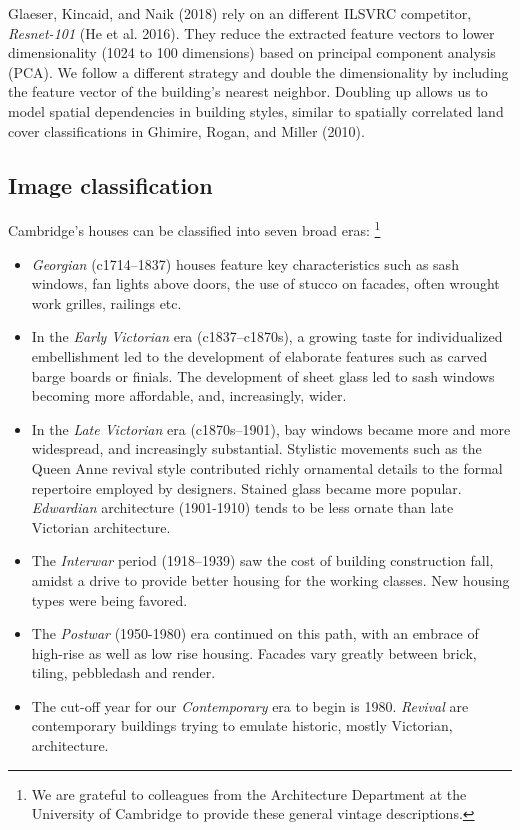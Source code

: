 \documentclass[]{article}
\let\rmarkdownfootnote\footnote%
\def\footnote{\protect\rmarkdownfootnote}
\begin{document}
Glaeser, Kincaid, and Naik (2018) rely on an different ILSVRC
competitor, \emph{Resnet-101} (He et al. 2016). They reduce the
extracted feature vectors to lower dimensionality (1024 to 100
dimensions) based on principal component analysis (PCA). We follow a
different strategy and double the dimensionality by including the
feature vector of the building's nearest neighbor. Doubling up allows us
to model spatial dependencies in building styles, similar to spatially
correlated land cover classifications in Ghimire, Rogan, and Miller
(2010).

\hypertarget{image-classification}{%
\subsection{Image classification}\label{image-classification}}

Cambridge's houses can be classified into seven broad eras:
\footnote{We are grateful to colleagues from the Architecture Department at the University of Cambridge to provide these general vintage descriptions.}

\begin{itemize}
\item
  \emph{Georgian} (c1714--1837) houses feature key characteristics such
  as sash windows, fan lights above doors, the use of stucco on facades,
  often wrought work grilles, railings etc.\label{def_eras}
\item
  In the \emph{Early Victorian} era (c1837--c1870s), a growing taste for
  individualized embellishment led to the development of elaborate
  features such as carved barge boards or finials. The development of
  sheet glass led to sash windows becoming more affordable, and,
  increasingly, wider.
\item
  In the \emph{Late Victorian} era (c1870s--1901), bay windows became
  more and more widespread, and increasingly substantial. Stylistic
  movements such as the Queen Anne revival style contributed richly
  ornamental details to the formal repertoire employed by designers.
  Stained glass became more popular. \emph{Edwardian} architecture
  (1901-1910) tends to be less ornate than late Victorian architecture.
\item
  The \emph{Interwar} period (1918--1939) saw the cost of building
  construction fall, amidst a drive to provide better housing for the
  working classes. New housing types were being favored.
\item
  The \emph{Postwar} (1950-1980) era continued on this path, with an
  embrace of high-rise as well as low rise housing. Facades vary greatly
  between brick, tiling, pebbledash and render.
\item
  The cut-off year for our \emph{Contemporary} era to begin is 1980.
  \emph{Revival} are contemporary buildings trying to emulate historic,
  mostly Victorian, architecture.
\end{itemize}
\end{document}
